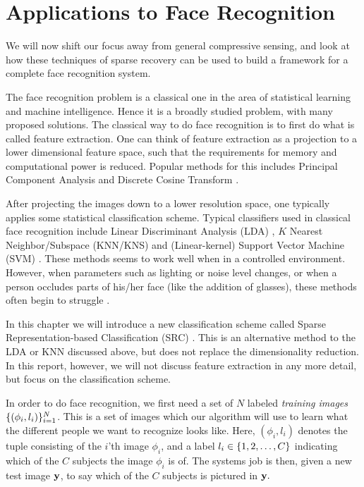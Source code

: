 \chapter{Applications to Face Recognition}
We will now shift our focus away from general compressive sensing, and look at how these techniques of sparse recovery can be used to build a framework for a complete face recognition system. 

The face recognition problem is a classical one in the area of statistical learning and machine intelligence. Hence it is a broadly studied problem, with many proposed solutions. The classical way to do face recognition is to first do what is called feature extraction. One can think of feature extraction as a projection to a lower dimensional feature space, such that the requirements for memory and computational power is reduced. Popular methods for this includes Principal Component Analysis and Discrete Cosine Transform \cite{bhat2014performance}.

After projecting the images down to a lower resolution space, one typically applies some statistical classification scheme. Typical classifiers used in classical face recognition include  Linear Discriminant Analysis (LDA) \cite{bhat2014performance}, $ K $ Nearest Neighbor/Subspace (KNN/KNS) \cite{lee2005acquiring} and (Linear-kernel) Support Vector Machine (SVM) \cite{wright09facerecog}. These methods seems to work well when in a controlled environment. However, when parameters such as lighting or noise level changes, or when a person occludes parts of his/her face (like the addition of glasses), these methods often begin to struggle \cite{eldar12theoryapplic}.

In this chapter we will introduce a new classification scheme called Sparse Representation-based Classification (SRC) \cite{wright09facerecog}. This is an alternative method to the LDA or KNN discussed above, but does not replace the dimensionality reduction. In this report, however, we will not discuss feature extraction in any more detail, but focus on the classification scheme. 

In order to do face recognition, we first need a set of $ N $ labeled \textit{training images} $ \{(\phi_{i}, l_{i})\}_{i=1}^{N} $. This is a set of images which our algorithm will use to learn what the different people we want to recognize looks like. Here, $ (\phi_{i}, l_{i}) $ denotes the tuple consisting of the $ i $'th image $ \phi_{i} $, and a label $ l_{i} \in \{1, 2, \ldots, C\} $ indicating which of the $ C $ subjects the image $ \phi_{i} $ is of. The systems job is then, given a new test image $ \mathbf{y} $, to say which of the $ C $ subjects is pictured in $ \mathbf{y}. $




